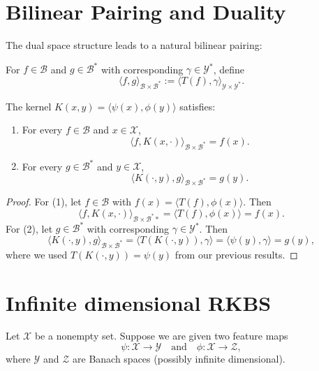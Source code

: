 \section{Bilinear Pairing and Duality}
The dual space structure leads to a natural bilinear pairing:
\begin{definition}
For $f \in \mathcal{B}$ and $g \in \mathcal{B}^*$ with corresponding $\gamma \in \mathcal{Y}^*$, define
\[
\langle f, g \rangle_{\mathcal{B}\times \mathcal{B}^*} := \langle T(f), \gamma\rangle_{\mathcal{Y}\times\mathcal{Y}^*}.
\]
\end{definition}
\begin{theorem}
The kernel $K(x,y)=\langle \psi(x), \phi(y)\rangle$ satisfies:
\begin{enumerate}
\item For every $f\in\mathcal{B}$ and $x\in\mathcal{X}$,
\[
\langle f, K(x,\cdot) \rangle_{\mathcal{B}\times \mathcal{B}^*} = f(x).
\]
\item For every $g\in\mathcal{B}^*$ and $y\in\mathcal{X}$,
\[
\langle K(\cdot,y), g \rangle_{\mathcal{B}\times \mathcal{B}^*} = g(y).
\]
\end{enumerate}
\end{theorem}
\begin{proof}
For (1), let $f\in \mathcal{B}$ with $f(x)= \langle T(f), \phi(x)\rangle$. Then
\[
\langle f, K(x,\cdot)\rangle_{\mathcal{B}\times \mathcal{B}^**} = \langle T(f), \phi(x)\rangle = f(x).
\]
For (2), let $g\in\mathcal{B}^*$ with corresponding $\gamma\in \mathcal{Y}^*$. Then
\[
\langle K(\cdot,y), g \rangle_{\mathcal{B}\times \mathcal{B}^*} = \langle T(K(\cdot,y)), \gamma\rangle = \langle \psi(y), \gamma\rangle = g(y),
\]
where we used $T(K(\cdot,y)) = \psi(y)$ from our previous results.
\end{proof}


\newpage

\section{Infinite dimensional RKBS}

Let $\mathcal{X}$ be a nonempty set. Suppose we are given two feature maps
\begin{equation}
\psi:\mathcal{X}\to \mathcal{Y} \quad \text{and} \quad \phi:\mathcal{X}\to \mathcal{Z},
\end{equation}
where $\mathcal{Y}$ and $\mathcal{Z}$ are Banach spaces (possibly infinite dimensional).

